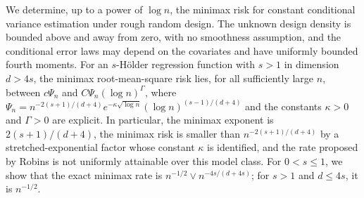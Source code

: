 We determine, up to a power of $\log n$, the minimax risk for constant conditional variance estimation under rough random design.  The unknown design density is bounded above and away from zero, with no smoothness assumption, and the conditional error laws may depend on the covariates and have uniformly bounded fourth moments. For an $s$-H\"older regression function with $s>1$ in dimension $d>4s$, the minimax root-mean-square risk lies, for all sufficiently large $n$, between $c\Psi_n$ and $C\Psi_n(\log n)^{\Gamma}$, where $\Psi_n=n^{-2(s+1)/(d+4)}e^{-\kappa\sqrt{\log n}}(\log n)^{(s-1)/(d+4)}$ and the constants $\kappa>0$ and $\Gamma>0$ are explicit. In particular, the minimax exponent is $2(s+1)/(d+4)$, the minimax risk is smaller than $n^{-2(s+1)/(d+4)}$ by a stretched-exponential factor whose constant $\kappa$ is identified, and the rate proposed by Robins is not uniformly attainable over this model class. For $0<s\le1$, we show that the exact minimax rate is $n^{-1/2}\vee n^{-4s/(d+4s)}$; for $s>1$ and $d\le4s$, it is $n^{-1/2}$.
